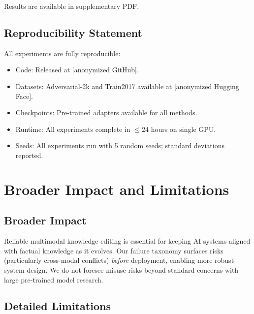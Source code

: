\documentclass[11pt]{article}
\begin{document}
Results are available in supplementary PDF.

\subsection{Reproducibility Statement}

All experiments are fully reproducible:
\begin{itemize}[leftmargin=*,itemsep=1pt]
  \item Code: Released at [anonymized GitHub].
  \item Datasets: Adversarial-2k and Train2017 available at [anonymized Hugging Face].
  \item Checkpoints: Pre-trained adapters available for all methods.
  \item Runtime: All experiments complete in $\leq 24$ hours on single GPU.
  \item Seeds: All experiments run with 5 random seeds; standard deviations reported.
\end{itemize}

\section{Broader Impact and Limitations}
\label{app:broader_impact}

\subsection{Broader Impact}

Reliable multimodal knowledge editing is essential for keeping AI systems
aligned with factual knowledge as it evolves. Our failure taxonomy surfaces
risks (particularly cross-modal conflicts) \emph{before} deployment, enabling
more robust system design. We do not foresee misuse risks beyond standard
concerns with large pre-trained model research.

\subsection{Detailed Limitations}
\end{document}
